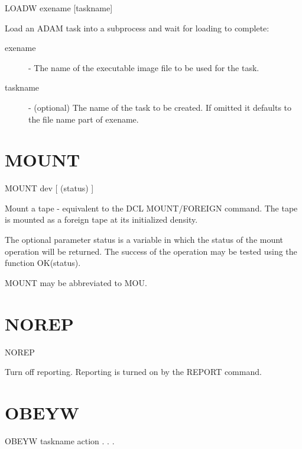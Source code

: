 \documentclass[twoside,11pt]{report}
\newcommand{\xlabel}[1]{}
\begin{document}
    LOADW \hspace{.5cm} exename \hspace{.5cm} [taskname]

    Load an ADAM task into a subprocess and wait for loading to complete:
\begin{description}

\item[exename] - The name of the executable image file to
            be used for the task.

\item[taskname] - (optional) The name of the task to be created.
            If omitted it defaults to the file name part of
            exename.

\end{description}

\section{\xlabel{MOUNT}MOUNT\label{MOUNT}}

    MOUNT \hspace{.5cm} dev \hspace{.5cm} [ (status) ]

 Mount a tape - equivalent to the DCL MOUNT/FOREIGN command. The tape
 is mounted as a foreign tape at its initialized density.

 The optional parameter status is a variable in which the status of
 the mount operation will be returned. The success of the operation
 may be tested using the function OK(status).

 MOUNT may be abbreviated to MOU.

\section{\xlabel{NOREP}NOREP\label{NOREP}}

   NOREP

Turn off reporting. Reporting is turned on by the REPORT command.
                 


\section{\xlabel{OBEYW}OBEYW\label{OBEYW}}

    OBEYW \hspace{.5cm} taskname \hspace{.5cm} action  . . . 
\end{document}
